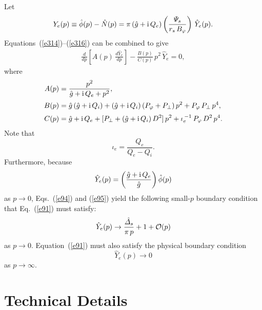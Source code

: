 \documentclass[12pt,prb,aps,notitlepage]{revtex4-1}
\begin{document}
Let 
\begin{align}\label{e95}
Y_e(p)\equiv \hat{\phi}(p)-\hat{N}(p)= \pi\,(\hat{g}+{\rm i}\,Q_e)\left(\frac{{\mit\Psi}_s}{r_s\,B_\varphi}\right)\,\hat{Y}_e(p).
\end{align}
 Equations~(\ref{e314})--(\ref{e316}) can be combined to give 
\begin{align}\label{e91}
\frac{d}{dp}\!\left[A(p)\,\frac{d\hat{Y}_e}{dp}\right] - \frac{B(p)}{C(p)}\,p^2\,\hat{Y}_e=0,
\end{align}
where
\begin{align}
A(p) &= \frac{p^2}{\hat{g}+{\rm i}\,Q_e+p^2},\label{e97a}\\[0.5ex]
B(p)&=\hat{g}\,(\hat{g}+{\rm i}\,Q_i)+(\hat{g}+{\rm i}\,Q_i)\,(P_\varphi+P_\perp)\,p^2 + P_\varphi\,P_\perp\,p^4,\\[0.5ex]
C(p) &=\hat{g}+{\rm i}\,Q_e+ [P_\perp+
(\hat{g}+{\rm i}\,Q_i)\,D^2]\,p^2 + \iota_e^{\,-1}\,P_\varphi\,D^2\,p^4.
\end{align}
Note that 
\begin{equation}
\iota_e = \frac{Q_e}{Q_e-Q_i}.
\end{equation} 
Furthermore, because
\begin{equation}
\hat{Y}_e(p) = \left(\frac{\hat{g}+{\rm i}\,Q_e}{\hat{g}}\right)\hat{\phi}(p)
\end{equation}
as $p\rightarrow 0$, Eqs.~(\ref{e94}) and (\ref{e95})
yield the following small-$p$ boundary condition that Eq.~(\ref{e91}) must satisfy:\,\cite{ed}
\begin{equation}\label{e101}
\hat{Y}_e(p)\rightarrow\frac{\hat{\mit\Delta}_s}{\pi\,p} + 1+ {\cal O}(p)
\end{equation}
as $p\rightarrow 0$.  Equation~(\ref{e91}) must also satisfy the  physical boundary condition 
\begin{equation}\label{e102}
\hat{Y}_e(p)\rightarrow 0
\end{equation}
as $p\rightarrow\infty$. 

\section{Technical Details}
\end{document}
